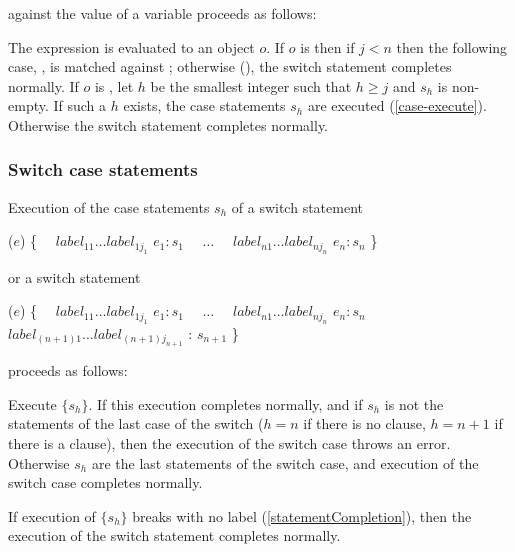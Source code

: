 \documentclass[makeidx]{article}
\begin{document}
{\noindent
against the value of a variable \id{} proceeds as follows:

\LMHash{}%
The expression  is evaluated to an object $o$.
If $o$ is \FALSE{} then if $j < n$ then the following case,
, is matched against \id;
otherwise (),
the switch statement completes normally.
If $o$ is \TRUE, let $h$ be the smallest integer
such that $h \ge j$ and $s_h$ is non-empty.
If such a $h$ exists, the case statements $s_h$ are executed
(\ref{case-execute}).
Otherwise the switch statement completes normally.


\subsubsection{Switch case statements}

\LMHash{}%
Execution of the case statements $s_h$ of a switch statement

\begin{normativeDartCode}
\SWITCH{} ($e$) \{
\ \ $label_{11} \ldots label_{1j_1}$ \CASE{} $e_1: s_1$
\ \ $\ldots$
\ \ $label_{n1} \ldots label_{nj_n}$ \CASE{} $e_n: s_n$
\}
\end{normativeDartCode}

or a switch statement

\begin{normativeDartCode}
\SWITCH{} ($e$) \{
\ \ $label_{11} \ldots label_{1j_1}$ \CASE{} $e_1: s_1$
\ \ $\ldots$
\ \ $label_{n1} \ldots label_{nj_n}$ \CASE{} $e_n: s_n$
\ \ $label_{(n+1)1} \ldots label_{(n+1)j_{n+1}}$ \DEFAULT{}: $s_{n+1}$
\}
\end{normativeDartCode}

proceeds as follows:

\LMHash{}%
Execute $\{s_h\}$.
If this execution completes normally,
and if $s_h$ is not the statements of the last case of the switch
($h = n$ if there is no \DEFAULT{} clause,
$h = n+1$ if there is a \DEFAULT{} clause),
then the execution of the switch case throws an error.
Otherwise $s_h$ are the last statements of the switch case,
and execution of the switch case completes normally.


If execution of $\{s_h\}$ breaks with no label (\ref{statementCompletion}),
then the execution of the switch statement completes normally.

}
\end{document}

